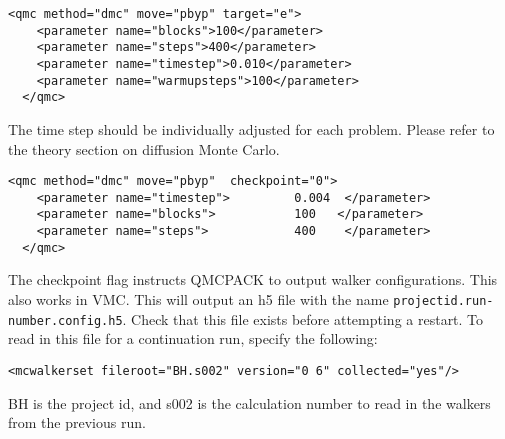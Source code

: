 \begin{itemize}


\end{itemize}

\begin{lstlisting}[style=QMCPXML,caption=The following is an example of a very simple DMC section. ]
  <qmc method="dmc" move="pbyp" target="e">
    <parameter name="blocks">100</parameter>
    <parameter name="steps">400</parameter>
    <parameter name="timestep">0.010</parameter>
    <parameter name="warmupsteps">100</parameter>
  </qmc>
\end{lstlisting}
The time step should be individually adjusted for each problem.  Please refer to the theory section
on diffusion Monte Carlo.


\begin{lstlisting}[style=QMCPXML,caption=The following is an example of running a simulation that can be restarted. ]
  <qmc method="dmc" move="pbyp"  checkpoint="0">
    <parameter name="timestep">         0.004  </parameter>
    <parameter name="blocks">           100   </parameter>
    <parameter name="steps">            400    </parameter>
  </qmc>
\end{lstlisting}
The checkpoint flag instructs QMCPACK to output walker configurations.  This also
works in VMC.  This will output an h5 file with the name \texttt{projectid.run-number.config.h5}.
Check that this file exists before attempting a restart.
To read in this file for a continuation run, specify the following:
\begin{lstlisting}[caption=Restart (read walkers from previous run) ]
 <mcwalkerset fileroot="BH.s002" version="0 6" collected="yes"/>
\end{lstlisting}
BH is the project id, and s002 is the calculation number to read in the walkers from the previous run.\\

